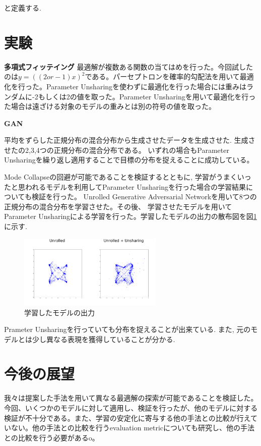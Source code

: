 \documentclass[techrep, submit, noauthor,preface]{ipsj}
\begin{document}
と定義する.

\section{実験}

{\bf 多項式フィッテイング}
最適解が複数ある関数の当てはめを行った。今回試したのは$y = ((2or-1)x)^2$である。パーセプトロンを確率的勾配法を用いて最適化を行った。Parameter Unsharingを使わずに最適化を行った場合には重みはランダムに-2もしくは2の値を取った。Parameter Unsharingを用いて最適化を行った場合は遠ざける対象のモデルの重みとは別の符号の値を取った。

{\bf GAN}

平均をずらした正規分布の混合分布から生成させたデータを生成させた. 生成させたの2,3,4つの正規分布の混合分布である。
いずれの場合もParameter Unsharingを繰り返し適用することで目標の分布を捉えることに成功している。

Mode Collapseの回避が可能であることを検証するとともに,
学習がうまくいったと思われるモデルを利用してParameter Unsharingを行った場合の学習結果についても検証を行った。
Unrolled Generative Adversarial Networkを用いて8つの正規分布の混合分布を学習させた。その後、
学習させたモデルを用いてParameter Unsharingによる学習を行った。学習したモデルの出力の散布図を図\ref{fig:unrolled}
に示す.

\begin{figure}[htb]
  \begin{center}
    \includegraphics[height=3.5cm]{unrolled.png}
  \end{center}
  \caption{学習したモデルの出力}
  \label{fig:unrolled}
\end{figure}

Prameter Unsharingを行っていても分布を捉えることが出来ている.
また, 元のモデルとは少し異なる表現を獲得していることが分かる.



\section{今後の展望}

我々は提案した手法を用いて異なる最適解の探索が可能であることを検証した。今回、いくつかのモデルに対して適用し、検証を行ったが、他のモデルに対する検証が不十分である。また、学習の安定化に寄与する他の手法との比較が行えていない。他の手法との比較を行うevaluation metricについても研究し、他の手法との比較を行う必要があるo。



\end{document}
